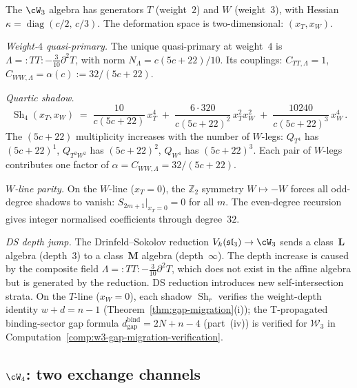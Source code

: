 \begin{computation}%
\label{comp:w3-shadow-tower}%
%
The $\cW_3$ algebra has generators $T$ (weight~$2$)
and $W$ (weight~$3$), with Hessian
$\kappa = \operatorname{diag}(c/2,\, c/3)$. The
deformation space is two-dimensional: $(x_T, x_W)$.

\smallskip
\noindent
\emph{Weight-$4$ quasi-primary.} The unique quasi-primary
at weight~$4$ is
$\Lambda = {:}TT{:} - \tfrac{3}{10}\partial^2 T$,
with norm $N_\Lambda = c(5c{+}22)/10$. Its couplings:
$C_{TT,\Lambda} = 1$,
$C_{WW,\Lambda} = \alpha(c) := 32/(5c{+}22)$.

\smallskip
\noindent
\emph{Quartic shadow.}
\begin{equation}\label{eq:w3-quartic}
 \operatorname{Sh}_4(x_T, x_W)
 \;=\;
 \frac{10}{c(5c{+}22)}\,x_T^4
 \;+\;
 \frac{6\cdot 320}{c(5c{+}22)^2}\,x_T^2 x_W^2
 \;+\;
 \frac{10240}{c(5c{+}22)^3}\,x_W^4\,.
\end{equation}
The $(5c{+}22)$ multiplicity increases with the number of
$W$-legs: $Q_{T^4}$ has $(5c{+}22)^1$,
$Q_{T^2W^2}$ has $(5c{+}22)^2$,
$Q_{W^4}$ has $(5c{+}22)^3$. Each pair of $W$-legs
contributes one factor of
$\alpha = C_{WW,\Lambda} = 32/(5c{+}22)$.

\smallskip
\noindent
\emph{$W$-line parity.}
On the $W$-line ($x_T = 0$), the $\mathbb{Z}_2$ symmetry
$W\mapsto -W$ forces all odd-degree shadows to vanish:
$S_{2m+1}|_{x_T=0} = 0$ for all $m$. The even-degree
recursion gives integer normalised coefficients through
degree~$32$.

\smallskip
\noindent
\emph{DS depth jump.}
The Drinfeld--Sokolov reduction
$V_k(\mathfrak{sl}_3) \to \cW_3$ sends a class~$\mathbf{L}$
algebra (depth~$3$) to a class~$\mathbf{M}$ algebra
(depth~$\infty$). The depth increase is caused by the
composite field $\Lambda = {:}TT{:} - \tfrac{3}{10}
\partial^2 T$, which does not exist in the affine algebra
but is generated by the reduction. DS reduction introduces
new self-intersection strata.
On the $T$-line ($x_W = 0$), each shadow $\operatorname{Sh}_r$
verifies the weight-depth identity $w + d = n - 1$
(Theorem~\ref{thm:gap-migration}(i)); the T-propagated
binding-sector gap formula
\(d_{\mathrm{gap}}^{\mathrm{bind}}=2N+n-4\) (part~(iv)) is verified
for \(\mathcal W_3\) in
Computation~\ref{comp:w3-gap-migration-verification}.
\end{computation}

\subsection{$\cW_4$: two exchange channels}%
\label{subsec:w4-shadow}%

